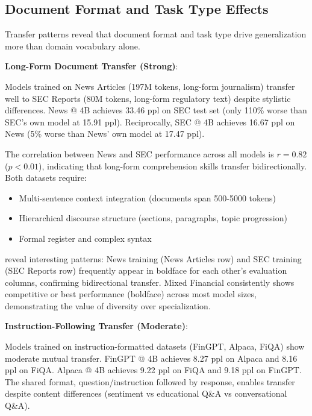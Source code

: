 \subsection{Document Format and Task Type Effects}

Transfer patterns reveal that document format and task type drive generalization more than domain vocabulary alone.

\textbf{Long-Form Document Transfer (Strong)}:

Models trained on News Articles (197M tokens, long-form journalism) transfer well to SEC Reports (80M tokens, long-form regulatory text) despite stylistic differences. News @ 4B achieves 33.46 ppl on SEC test set (only 110\% worse than SEC's own model at 15.91 ppl). Reciprocally, SEC @ 4B achieves 16.67 ppl on News (5\% worse than News' own model at 17.47 ppl).

The correlation between News and SEC performance across all models is $r = 0.82$ ($p < 0.01$), indicating that long-form comprehension skills transfer bidirectionally. Both datasets require:
\begin{itemize}
\item Multi-sentence context integration (documents span 500-5000 tokens)
\item Hierarchical discourse structure (sections, paragraphs, topic progression)
\item Formal register and complex syntax
\end{itemize}





 reveal interesting patterns: News training (News Articles row) and SEC training (SEC Reports row) frequently appear in boldface for each other's evaluation columns, confirming bidirectional transfer. Mixed Financial consistently shows competitive or best performance (boldface) across most model sizes, demonstrating the value of diversity over specialization.

\textbf{Instruction-Following Transfer (Moderate)}:

Models trained on instruction-formatted datasets (FinGPT, Alpaca, FiQA) show moderate mutual transfer. FinGPT @ 4B achieves 8.27 ppl on Alpaca and 8.16 ppl on FiQA. Alpaca @ 4B achieves 9.22 ppl on FiQA and 9.18 ppl on FinGPT. The shared format, question/instruction followed by response, enables transfer despite content differences (sentiment vs educational Q\&A vs conversational Q\&A).

